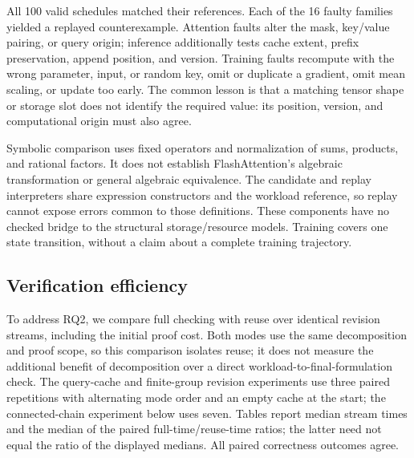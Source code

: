 \documentclass[11pt]{article}
\begin{document}
All 100 valid schedules matched their references. Each of the 16 faulty families yielded a replayed counterexample. Attention faults alter the mask, key/value pairing, or query origin; inference additionally tests cache extent, prefix preservation, append position, and version. Training faults recompute with the wrong parameter, input, or random key, omit or duplicate a gradient, omit mean scaling, or update too early. The common lesson is that a matching tensor shape or storage slot does not identify the required value: its position, version, and computational origin must also agree.

Symbolic comparison uses fixed operators and normalization of sums, products, and rational factors. It does not establish FlashAttention's algebraic transformation or general algebraic equivalence. The candidate and replay interpreters share expression constructors and the workload reference, so replay cannot expose errors common to those definitions. These components have no checked bridge to the structural storage/resource models. Training covers one state transition, without a claim about a complete training trajectory.

\subsection{Verification efficiency}
To address RQ2, we compare full checking with reuse over identical revision streams, including the initial proof cost. Both modes use the same decomposition and proof scope, so this comparison isolates reuse; it does not measure the additional benefit of decomposition over a direct workload-to-final-formulation check. The query-cache and finite-group revision experiments use three paired repetitions with alternating mode order and an empty cache at the start; the connected-chain experiment below uses seven. Tables report median stream times and the median of the paired full-time/reuse-time ratios; the latter need not equal the ratio of the displayed medians. All paired correctness outcomes agree.
\end{document}
